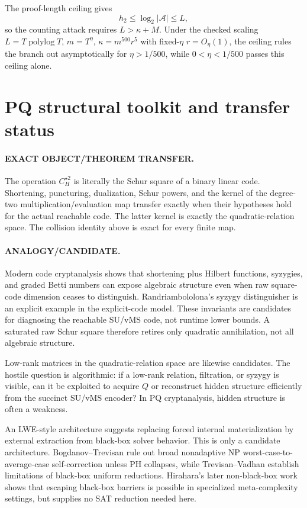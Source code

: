 \documentclass[11pt]{article}
\begin{document}
The proof-length ceiling gives
\[
h_2\le\log_2|\mathcal A|\le L,
\]
so the counting attack requires \(L>\kappa+M\). Under the checked scaling \(L=T\operatorname{polylog}T\), \(m=T^\eta\), \(\kappa=m^{500}r^5\) with fixed-\(\eta\) \(r=O_\eta(1)\), the ceiling rules the branch out asymptotically for \(\eta>1/500\), while \(0<\eta<1/500\) passes this ceiling alone.

\section*{PQ structural toolkit and transfer status}
\paragraph{EXACT OBJECT/THEOREM TRANSFER.}
The operation \(C_H^{\star2}\) is literally the Schur square of a binary linear code. Shortening, puncturing, dualization, Schur powers, and the kernel of the degree-two multiplication/evaluation map transfer exactly when their hypotheses hold for the actual reachable code. The latter kernel is exactly the quadratic-relation space. The collision identity above is exact for every finite map.

\paragraph{ANALOGY/CANDIDATE.}
Modern code cryptanalysis shows that shortening plus Hilbert functions, syzygies, and graded Betti numbers can expose algebraic structure even when raw square-code dimension ceases to distinguish. Randriambololona's syzygy distinguisher is an explicit example in the explicit-code model. These invariants are candidates for diagnosing the reachable SU/vMS code, not runtime lower bounds. A saturated raw Schur square therefore retires only quadratic annihilation, not all algebraic structure.

Low-rank matrices in the quadratic-relation space are likewise candidates. The hostile question is algorithmic: if a low-rank relation, filtration, or syzygy is visible, can it be exploited to acquire \(Q\) or reconstruct hidden structure efficiently from the succinct SU/vMS encoder? In PQ cryptanalysis, hidden structure is often a weakness.

An LWE-style architecture suggests replacing forced internal materialization by external extraction from black-box solver behavior. This is only a candidate architecture. Bogdanov--Trevisan rule out broad nonadaptive NP worst-case-to-average-case self-correction unless PH collapses, while Trevisan--Vadhan establish limitations of black-box uniform reductions. Hirahara's later non-black-box work shows that escaping black-box barriers is possible in specialized meta-complexity settings, but supplies no SAT reduction needed here.
\end{document}
